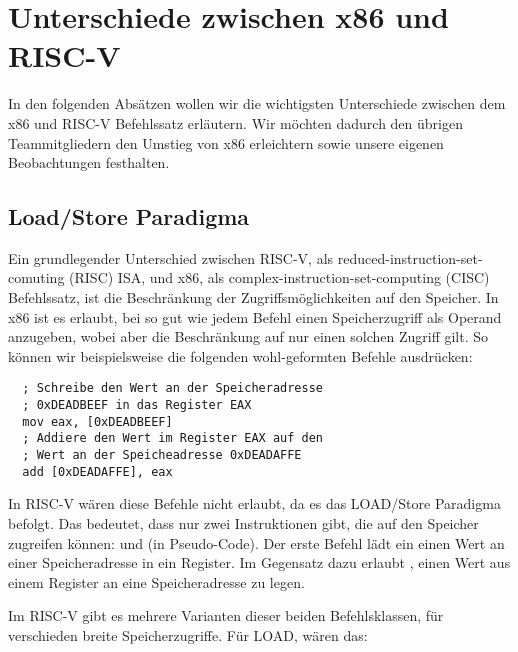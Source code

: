 \section{Unterschiede zwischen x86 und RISC-V}

In den folgenden Absätzen wollen wir die wichtigsten Unterschiede zwischen dem
x86 und RISC-V Befehlssatz erläutern. Wir möchten dadurch den übrigen
Teammitgliedern den Umstieg von x86 erleichtern sowie unsere eigenen
Beobachtungen festhalten.

\subsection{Load/Store Paradigma}

Ein grundlegender Unterschied zwischen RISC-V, als
reduced-instruction-set-comuting (RISC) ISA, und x86, als
complex-instruction-set-computing (CISC) Befehlssatz, ist die Beschränkung der
Zugriffsmöglichkeiten auf den Speicher. In x86 ist es erlaubt, bei so gut wie
jedem Befehl einen Speicherzugriff als Operand anzugeben, wobei aber die
Beschränkung auf nur einen solchen Zugriff gilt. So können wir beispielsweise
die folgenden wohl-geformten Befehle ausdrücken:

\begin{lstlisting}
  ; Schreibe den Wert an der Speicheradresse
  ; 0xDEADBEEF in das Register EAX
  mov eax, [0xDEADBEEF]
  ; Addiere den Wert im Register EAX auf den
  ; Wert an der Speicheadresse 0xDEADAFFE
  add [0xDEADAFFE], eax
\end{lstlisting}

In RISC-V wären diese Befehle nicht erlaubt, da es das LOAD/Store Paradigma
befolgt. Das bedeutet, dass nur zwei Instruktionen gibt, die auf den Speicher
zugreifen können:  und  (in Pseudo-Code). Der erste
Befehl lädt ein einen Wert an einer Speicheradresse in ein Register. Im
Gegensatz dazu erlaubt , einen Wert aus einem Register an eine
Speicheradresse zu legen.

Im RISC-V gibt es mehrere Varianten dieser beiden Befehlsklassen, für
verschieden breite Speicherzugriffe. Für LOAD, wären das:


